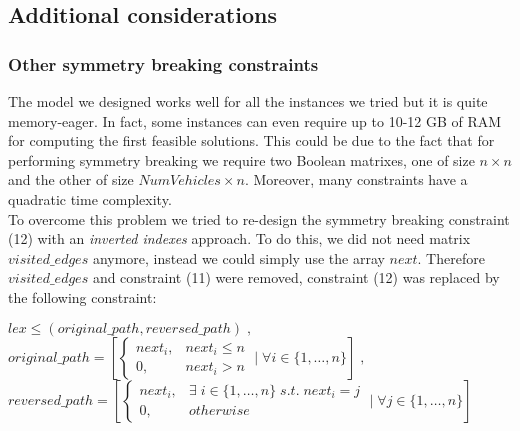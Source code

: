 \documentclass[../main.tex]{subfiles}
\begin{document}
\subsection{Additional considerations}
\label{subsec:additional-considerations}

\subsubsection{Other symmetry breaking constraints}
\label{subsubsec:other-symmetry-breaking-constraints}
The model we designed works well for all the instances we tried but it is quite memory-eager. In fact, some instances can even require up to 10-12 GB of RAM for computing the first feasible solutions.
This could be due to the fact that for performing symmetry breaking we require two Boolean matrixes, one of size $n\times{}n$ and the other of size $NumVehicles\times{}n$. Moreover, many constraints have a quadratic time complexity.\\
To overcome this problem we tried to re-design the symmetry breaking constraint (12) with an \textit{inverted indexes} approach. To do this, we did not need matrix $visited\_edges$ anymore, instead we could simply use the array $next$.
Therefore $visited\_edges$ and constraint (11) were removed, constraint (12) was replaced by the following constraint:
\begin{center}
    \begin{math}
        lex\leq(original\_path, reversed\_path) \; ,
    \end{math}\\
    \begin{math}
        original\_path = [
            \begin{cases}
                next_i, & next_i \leq n\\
                0, & next_i > n
            \end{cases} \; | \; \forall{} i \in \{1,\dots,n\}
        ] \; ,
    \end{math}\\
    \begin{math}
        reversed\_path = [
            \begin{cases}
                next_i, & \exists \; i \in \{1,\dots,n\} \; s.t. \; next_i = j\\
                0, & otherwise
            \end{cases} \; | \; \forall{} j \in \{1,\dots,n\}
        ]
    \end{math}
\end{center}
\end{document}
